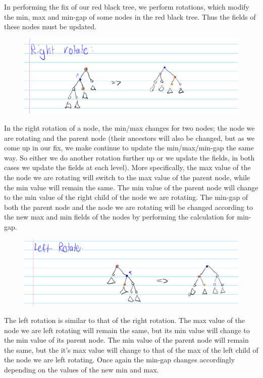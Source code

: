 \documentclass[12pt]{article}
\theoremstyle{definition}
\theoremstyle{remark}
\begin{document}
\begin{enumerate}
\begin{enumerate}
In performing the fix of our red black tree, we perform rotations, which modify the min, max and min-gap of some nodes in the red black tree. Thus the fields of these nodes must be updated. 

\begin{figure}[htb!]
     \centering
     \includegraphics[scale=0.2]{graphics/Right_Rotate.jpg}
\end{figure}

In the right rotation of a node, the min/max changes for two nodes; the node we are rotating and the parent node (their ancestors will also be changed, but as we come up in our fix, we make continue to update the min/max/min-gap the same way. So either we do another rotation further up or we update the fields, in both cases we update the fields at each level). More specifically, the max value of the the node we are rotating will switch to the max value of the parent node, while the min value will remain the same. The min value of the parent node will change to the min value of the right child of the node we are rotating. The min-gap of both the parent node and the node we are rotating will be changed according to the new max and min fields of the nodes by performing the calculation for min-gap. 

\begin{figure}[htb!]
     \centering
     \includegraphics[scale=0.2]{graphics/Left_Rotate.jpg}
\end{figure}

The left rotation is similar to that of the right rotation. The max value of the node we are left rotating will remain the same, but its min value will change to the min value of its parent node. The min value of the parent node will remain the same, but the it's max value will change to that of the max of the left child of the node we are left rotating. Once again the min-gap changes accordingly depending on the values of the new min and max. 


\end{enumerate}
\end{enumerate}
\end{document}
